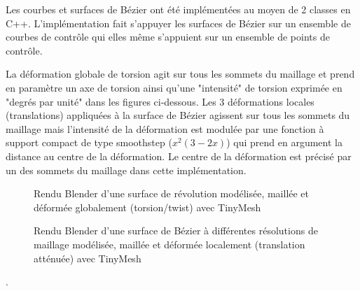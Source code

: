 Les courbes et surfaces de Bézier ont été implémentées au moyen de 2 classes en C++. L'implémentation fait s'appuyer les surfaces de Bézier sur un ensemble de courbes de contrôle
qui elles même s'appuient sur un ensemble de points de contrôle.

La déformation globale de torsion agit sur tous les sommets du maillage et prend en paramètre un axe de torsion ainsi qu'une "intensité" de torsion exprimée en "degrés par unité" dans
les figures ci-dessous. Les 3 déformations locales (translations) appliquées à la surface de Bézier agissent sur tous les sommets du maillage mais l'intensité de la déformation
est modulée par une fonction à support compact de type smoothstep ($x^2(3 -2x)$) qui prend en argument la distance au centre de la déformation. Le centre de la déformation
est précisé par un des sommets du maillage dans cette implémentation.

\begin{figure}[h!]

	\caption{Rendu Blender d'une surface de révolution modélisée, maillée et déformée globalement (torsion/twist) avec TinyMesh}
	\label{ref}
\end{figure}
\FloatBarrier

\begin{figure}[h!]

	\caption{Rendu Blender d'une surface de Bézier à différentes résolutions de maillage modélisée, maillée et déformée localement (translation atténuée) avec TinyMesh}
	\label{ref}
\end{figure}
\FloatBarrier

.

